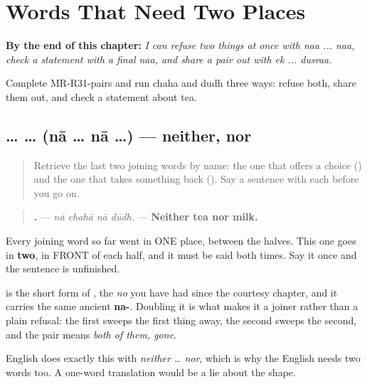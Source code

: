 
\chapter{Words That Need Two Places}
\label{ch:mr-paired-joins}

\begin{chapteropening}
\textbf{By the end of this chapter:} \emph{I can refuse two things at once with naa ... naa, check a statement with a final naa, and share a pair out with ek ... dusraa.}

Complete MR-R31-pairs and run chaha and dudh three ways: refuse both, share them out, and check a statement about tea.
\end{chapteropening}

\section[\texorpdfstring{\mr{ना} … \mr{ना} … (nā … nā …)}{ना … ना … (nā … nā …)}]{ …  … (nā … nā …) — neither, nor}

\label{lesson:MR-C31-naa-naa}



\begin{quote}
Retrieve the last two joining words by name: the one that offers a choice (\textbf{}) and the one that takes something back (\textbf{}). Say a sentence with each before you go on.
\end{quote}

\begin{grammarlens}[title={Grammar Lens: the word that comes in a pair}]
\begin{quote}
\textbf{   .} — \emph{nā chahā nā dūdh.} — \textbf{Neither tea nor milk.}
\end{quote}

Every joining word so far went in ONE place, between the halves. This one goes in \textbf{two}, in FRONT of each half, and it must be said both times. Say it once and the sentence is unfinished.

\textbf{} is the short form of \textbf{}, the \emph{no} you have had since the courtesy chapter, and it carries the same ancient \textbf{na-}. Doubling it is what makes it a joiner rather than a plain refusal: the first \textbf{} sweeps the first thing away, the second sweeps the second, and the pair means \emph{both of them, gone}.

English does exactly this with \emph{neither … nor}, which is why the English needs two words too. A one-word translation would be a lie about the shape.
\end{grammarlens}

